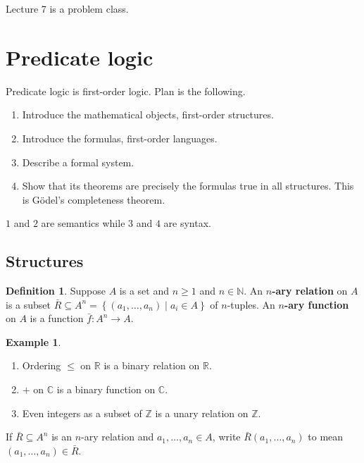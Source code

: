 \documentclass{article}
\newcommand{\N}{\mathbb{N}}
\newcommand{\Z}{\mathbb{Z}}
\newcommand{\R}{\mathbb{R}}
\newcommand{\C}{\mathbb{C}}
\newcommand{\rb}[1]{\left( #1 \right)}
\newcommand{\cb}[1]{\left\{ #1 \right\}}
\theoremstyle{definition}\newtheorem{definition}{Definition}[subsection]
\theoremstyle{definition}\newtheorem{remark}[definition]{Remark}
\theoremstyle{definition}\newtheorem*{example}{Example}
\theoremstyle{definition}\newtheorem*{note}{Note}
\begin{document}
Lecture 7 is a problem class.


\section{Predicate logic}

Predicate logic is first-order logic. Plan is the following.
\begin{enumerate}
\item Introduce the mathematical objects, first-order structures.
\item Introduce the formulas, first-order languages.
\item Describe a formal system.
\item Show that its theorems are precisely the formulas true in all structures. This is Gödel's completeness theorem.
\end{enumerate}
$ 1 $ and $ 2 $ are semantics while $ 3 $ and $ 4 $ are syntax.

\subsection{Structures}

\begin{definition}
Suppose $ A $ is a set and $ n \ge 1 $ and $ n \in \N $. An \textbf{$ n $-ary relation} on $ A $ is a subset $ \bar{R} \subseteq A^n = \cb{\rb{a_1, \dots, a_n} \mid a_i \in A} $ of $ n $-tuples. An \textbf{$ n $-ary function} on $ A $ is a function $ \bar{f} : A^n \to A $.
\end{definition}

\begin{example}
\hfill
\begin{enumerate}
\item Ordering $ \le $ on $ \R $ is a binary relation on $ \R $.
\item $ + $ on $ \C $ is a binary function on $ \C $.
\item Even integers as a subset of $ \Z $ is a unary relation on $ \Z $.
\end{enumerate}
\end{example}

If $ \bar{R} \subseteq A^n $ is an $ n $-ary relation and $ a_1, \dots, a_n \in A $, write $ \bar{R}\rb{a_1, \dots, a_n} $ to mean $ \rb{a_1, \dots, a_n} \in \bar{R} $.
\end{document}
